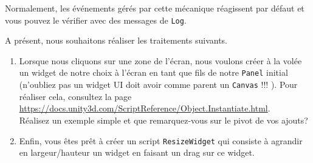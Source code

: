 \documentclass[a4paper,10pt]{article}
\begin{document}
Normalement, les événements gérés par cette mécanique réagissent par défaut et vous pouvez le vérifier avec des messages de \texttt{Log}.

A présent, nous souhaitons réaliser les traitements suivants.
\begin{enumerate}
	\item  Lorsque nous cliquons sur une zone de l'écran, nous voulons créer à la volée un widget de notre choix à l'écran en tant que fils de notre \texttt{Panel} initial (n'oubliez pas un widget UI doit avoir comme parent un \texttt{Canvas} !!! ). Pour réaliser cela, consultez  la page \url{https://docs.unity3d.com/ScriptReference/Object.Instantiate.html}. \\	
	Réalisez un exemple simple et que remarquez-vous sur le pivot de vos ajouts?
 
	\item Enfin, vous êtes prêt à créer un script \texttt{ResizeWidget} qui consiste à agrandir en largeur/hauteur un widget en faisant un drag sur ce widget.
	
\end{enumerate}
\end{document}
